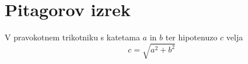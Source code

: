 \documentclass{article}
\begin{document}
\section*{Pitagorov izrek}
V pravokotnem trikotniku s katetama \(a\) in \(b\) ter hipotenuzo \(c\) velja
\[ c = \sqrt{a^2 + b^2} \]
\end{document}

